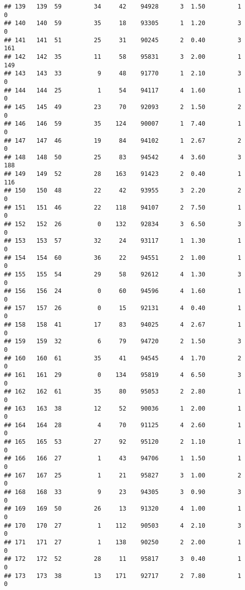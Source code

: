 \documentclass[
]{article}
\begin{document}
\begin{verbatim}
## 139   139  59         34     42    94928      3  1.50         1        0
## 140   140  59         35     18    93305      1  1.20         3        0
## 141   141  51         25     31    90245      2  0.40         3      161
## 142   142  35         11     58    95831      3  2.00         1      149
## 143   143  33          9     48    91770      1  2.10         3        0
## 144   144  25          1     54    94117      4  1.60         1        0
## 145   145  49         23     70    92093      2  1.50         2        0
## 146   146  59         35    124    90007      1  7.40         1        0
## 147   147  46         19     84    94102      1  2.67         2        0
## 148   148  50         25     83    94542      4  3.60         3      188
## 149   149  52         28    163    91423      2  0.40         1      116
## 150   150  48         22     42    93955      3  2.20         2        0
## 151   151  46         22    118    94107      2  7.50         1        0
## 152   152  26          0    132    92834      3  6.50         3        0
## 153   153  57         32     24    93117      1  1.30         1        0
## 154   154  60         36     22    94551      2  1.00         1        0
## 155   155  54         29     58    92612      4  1.30         3        0
## 156   156  24          0     60    94596      4  1.60         1        0
## 157   157  26          0     15    92131      4  0.40         1        0
## 158   158  41         17     83    94025      4  2.67         1        0
## 159   159  32          6     79    94720      2  1.50         3        0
## 160   160  61         35     41    94545      4  1.70         2        0
## 161   161  29          0    134    95819      4  6.50         3        0
## 162   162  61         35     80    95053      2  2.80         1        0
## 163   163  38         12     52    90036      1  2.00         1        0
## 164   164  28          4     70    91125      4  2.60         1        0
## 165   165  53         27     92    95120      2  1.10         1        0
## 166   166  27          1     43    94706      1  1.50         1        0
## 167   167  25          1     21    95827      3  1.00         2        0
## 168   168  33          9     23    94305      3  0.90         3        0
## 169   169  50         26     13    91320      4  1.00         1        0
## 170   170  27          1    112    90503      4  2.10         3        0
## 171   171  27          1    138    90250      2  2.00         1        0
## 172   172  52         28     11    95817      3  0.40         1        0
## 173   173  38         13    171    92717      2  7.80         1        0

\end{verbatim}
\end{document}
